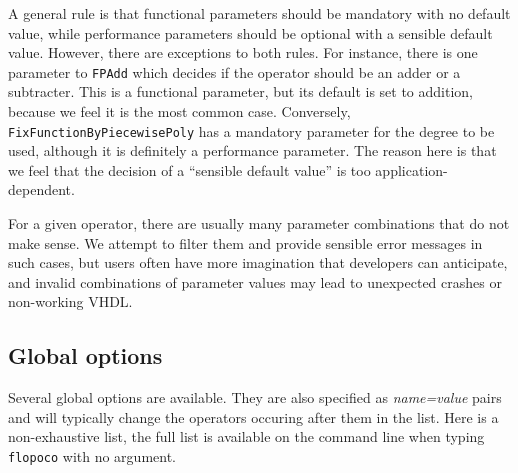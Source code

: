 \documentclass{article}
\begin{document}
A general rule is that functional parameters should be mandatory with no default value, while performance parameters should be optional with a sensible default value.
However, there are exceptions to both rules.
For instance, there is one parameter to \texttt{FPAdd} which decides if the operator should be an adder or a subtracter.
This is a functional parameter, but its default is set to addition, because we feel it is the most common case.
Conversely, \texttt{FixFunctionByPiecewisePoly} has a mandatory parameter for the degree to be used, although it is definitely a performance parameter.
The reason here is that we feel that the decision of a ``sensible default value'' is too application-dependent.

For a given operator, there are usually many parameter combinations that do not make sense.
We attempt to filter them and provide sensible error messages in such cases, but users often have more imagination that developers can anticipate, and invalid combinations of parameter values may lead to unexpected crashes or non-working VHDL.


\subsection{Global options}
Several global options are available.
They are also specified as  \emph{name=value} pairs and will typically change the operators occuring after them in the list. 
Here is a non-exhaustive list, the full list is available on the command line when typing \texttt{flopoco} with no argument.
\end{document}
